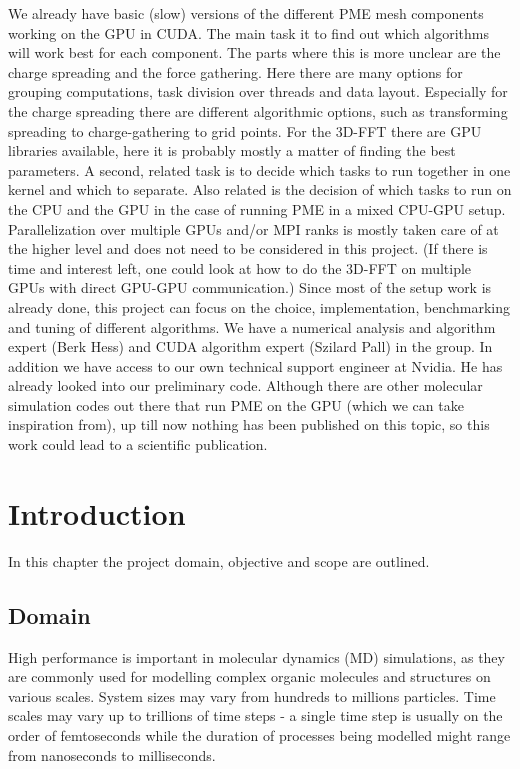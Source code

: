 \documentclass[12pt,a4paper]{report}
\begin{document}
We already have basic (slow) versions of the different PME mesh components working on the GPU in CUDA. The main task it to find out which algorithms will work best for each component. The parts where this is more unclear are the charge spreading and the force gathering. Here there are many options for grouping computations, task division over threads and data layout. Especially for the charge spreading there are different algorithmic options, such as transforming spreading to charge-gathering to grid points. For the 3D-FFT there are GPU libraries available, here it is probably mostly a matter of finding the best parameters. A second, related task is to decide which tasks to run together in one kernel and which to separate. Also related is the decision of which tasks to run on the CPU and the GPU in the case of running PME in a mixed CPU-GPU setup. Parallelization over multiple GPUs and/or MPI ranks is mostly taken care of at the higher level and does not need to be considered in this project. (If there is time and interest left, one could look at how to do the 3D-FFT on multiple GPUs with direct GPU-GPU communication.) Since most of the setup work is already done, this project can focus on the choice, implementation, benchmarking and tuning of different algorithms. We have a numerical analysis and algorithm expert (Berk Hess) and CUDA algorithm expert (Szilard Pall) in the group. In addition we have access to our own technical support engineer at Nvidia. He has already looked into our preliminary code. Although there are other molecular simulation codes out there that run PME on the GPU (which we can take inspiration from), up till now nothing has been published on this topic, so this work could lead to a scientific publication.


\fi





\newpage
\chapter{Introduction}

In this chapter the project domain, objective and scope are outlined.

\section{Domain}

High performance is important in molecular dynamics (MD) simulations, as they are commonly used for modelling complex organic molecules and structures on various scales. System sizes may vary from hundreds to millions particles. Time scales may vary up to trillions of time steps - a single time step is usually on the order of femtoseconds while the duration of processes being modelled might range from nanoseconds to milliseconds.
\end{document}
